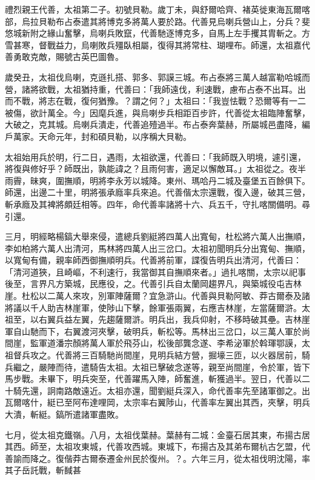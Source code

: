 \begin{pinyinscope}
禮烈親王代善，太祖第二子。初號貝勒。歲丁未，與舒爾哈齊、褚英徙東海瓦爾喀部，烏拉貝勒布占泰遣其將博克多將萬人要於路。代善見烏喇兵營山上，分兵？斐悠城新附之緣山奮擊，烏喇兵敗竄，代善馳逐博克多，自馬上左手攫其胄斬之。方雪甚寒，督戰益力，烏喇敗兵殭臥相屬，復得其將常柱、瑚哩布。師還，太祖嘉代善勇敢克敵，賜號古英巴圖魯。

歲癸丑，太祖伐烏喇，克遜扎搭、郭多、郭謨三城。布占泰將三萬人越富勒哈城而營，諸將欲戰，太祖猶持重，代善曰：「我師遠伐，利速戰，慮布占泰不出耳。出而不戰，將志在戰，復何猶豫。？謂之何？」太祖曰：「我豈怯戰？恐爾等有一二被傷，欲計萬全。今」因麾兵進，與烏喇步兵相距百步許，代善從太祖臨陣奮擊，大破之，克其城。烏喇兵潰走，代善追殪過半。布占泰奔葉赫，所屬城邑盡降，編戶萬家。天命元年，封和碩貝勒，以序稱大貝勒。

太祖始用兵於明，行二日，遇雨，太祖欲還，代善曰：「我師既入明境，遽引還，將復與修好乎？師既出，孰能諱之？且雨何害，適足以懈敵耳。」太祖從之。夜半雨霽，昧爽，圍撫順，明將李永芳以城降。東州、瑪哈丹二城及臺堡五百餘俱下。師還，出邊二十里，明將張承廕率兵來追。代善偕太宗還戰，復入邊，破其三營，斬承廕及其裨將頗廷相等。四年，命代善率諸將十六、兵五千，守扎喀關備明。尋引還。

三月，明經略楊鎬大舉來侵，遣總兵劉綎將四萬人出寬甸，杜松將六萬人出撫順，李如柏將六萬人出清河，馬林將四萬人出三岔口。太祖初聞明兵分出寬甸、撫順，以寬甸有備，親率師西御撫順明兵。代善將前軍，諜復告明兵出清河，代善曰：「清河道狹，且崎嶇，不利速行，我當御其自撫順來者。」過扎喀關，太宗以祀事後至，言界凡方築城，民應役，之。代善引兵自太蘭岡趨界凡，與築城役屯吉林崖。杜松以二萬人來攻，別軍陣薩爾？宜急滸山。代善與貝勒阿敏、莽古爾泰及諸將議以千人助吉林崖軍，使陟山下擊，餘軍張兩翼，右應吉林崖，左當薩爾滸。太祖至，以右翼兵益左翼，先趨薩爾滸。明兵出，我兵仰射，不移時破其壘。吉林崖軍自山馳而下，右翼渡河夾擊，破明兵，斬松等。馬林出三岔口，以三萬人軍於尚間崖，監軍道潘宗顏將萬人軍於飛芬山，松後部龔念遂、李希泌軍於斡琿鄂謨，太祖督兵攻之。代善將三百騎馳尚間崖，見明兵結方營，掘壕三匝，以火器居前，騎兵繼之，嚴陣而待，遣騎告太祖。太祖已擊破念遂等，親至尚間崖，令於軍，皆下馬步戰。未畢下，明兵突至，代善躍馬入陣，師奮進，斬獲過半。翌日，代善以二十騎先還，詗南路敵遠近。太祖亦還，聞劉綎兵深入，命代善率先至諸軍御之。出瓦爾喀什，綎已至阿布達哩岡，太宗率右翼陟山，代善率左翼出其西，夾擊，明兵大潰，斬綎。鎬所遣諸軍盡敗。

七月，從太祖克鐵嶺。八月，太祖伐葉赫。葉赫有二城：金臺石居其東，布揚古居其西。師至，太祖攻東城，代善攻西城。東城下，布揚古及其弟布爾杭古乞盟，代善諭而降之。復偕莽古爾泰遷金州民於復州。？。六年三月，從太祖伐明沈陽，率其子岳託戰，斬馘甚


\end{pinyinscope}
